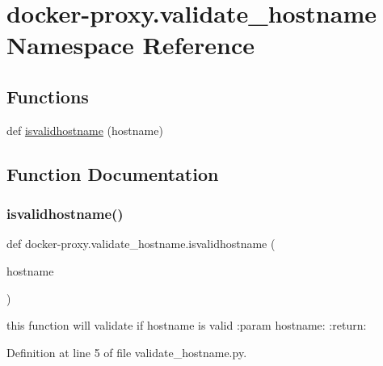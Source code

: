 \hypertarget{namespacedocker-proxy_1_1validate__hostname}{}\section{docker-\/proxy.validate\+\_\+hostname Namespace Reference}
\label{namespacedocker-proxy_1_1validate__hostname}
\subsection*{Functions}
\begin{DoxyCompactItemize}
\item 
def \hyperlink{namespacedocker-proxy_1_1validate__hostname_a78870bf36758d0abb57f63eea91fd8b7}{isvalidhostname} (hostname)
\end{DoxyCompactItemize}


\subsection{Function Documentation}
\hypertarget{namespacedocker-proxy_1_1validate__hostname_a78870bf36758d0abb57f63eea91fd8b7}{}\label{namespacedocker-proxy_1_1validate__hostname_a78870bf36758d0abb57f63eea91fd8b7} 
\subsubsection{\texorpdfstring{isvalidhostname()}{isvalidhostname()}}
{\footnotesize\ttfamily def docker-\/proxy.\+validate\+\_\+hostname.\+isvalidhostname (\begin{DoxyParamCaption}\item[{}]{hostname }\end{DoxyParamCaption})}

\begin{DoxyVerb}this function will validate if hostname is valid
:param hostname:
:return:
\end{DoxyVerb}
 

Definition at line 5 of file validate\+\_\+hostname.\+py.

